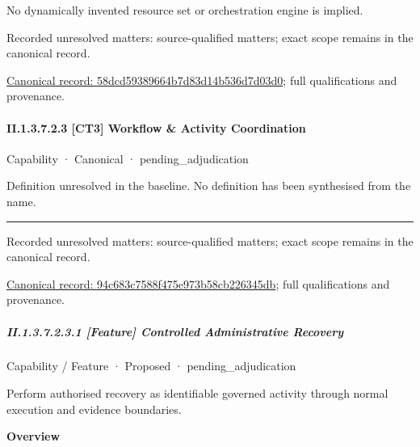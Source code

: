 No dynamically invented resource set or orchestration engine is implied.


{\small Recorded unresolved matters: source-qualified matters; exact scope remains in the canonical record.}\par
{\footnotesize \href{../../../../continuum/strategy/capability/feature/58dcd59389664b7d83d14b536d7d03d0.md}{Canonical record: 58dcd59389664b7d83d14b536d7d03d0}; full qualifications and provenance.}\par
\paragraph*{II.1.3.7.2.3 [CT3] Workflow \& Activity Coordination}
\label{navigation:II.1.3.7.2.3}

\label{element:94c683c7588f475e973b58cb226345db}
{\small Capability · Canonical · pending\_adjudication}\par

Definition unresolved in the baseline. No definition has been synthesised from the name.



\medskip\hrule\medskip

{\small Recorded unresolved matters: source-qualified matters; exact scope remains in the canonical record.}\par
{\footnotesize \href{../../../../continuum/strategy/capability/94c683c7588f475e973b58cb226345db.md}{Canonical record: 94c683c7588f475e973b58cb226345db}; full qualifications and provenance.}\par
\subparagraph*{II.1.3.7.2.3.1 [Feature] Controlled Administrative Recovery}
\label{navigation:II.1.3.7.2.3.1}

\label{element:21d0601a852043a4b0b1d4fe841108d2}
{\small Capability / Feature · Proposed · pending\_adjudication}\par

Perform authorised recovery as identifiable governed activity through normal execution and evidence boundaries.



\textbf{Overview}



